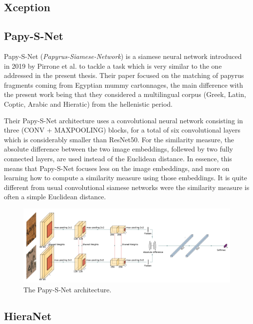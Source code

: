 \documentclass[11pt]{report}
\begin{document}
\subsection{Xception}

\subsection{Papy-S-Net}

Papy-S-Net (\emph{Papyrus-Siamese-Network}) is a siamese neural network introduced in 2019 by Pirrone et al. \cite{pir19} to tackle a task which is very similar to the one addressed in the present thesis. Their paper focused on the matching of papyrus fragments coming from Egyptian mummy cartonnages, the main difference with the present work being that they considered a multilingual corpus (Greek, Latin, Coptic, Arabic and Hieratic) from the hellenistic period.\newline

Their Papy-S-Net architecture uses a convolutional neural network consisting in three (CONV + MAXPOOLING) blocks, for a total of six convolutional layers which is considerably smaller than ResNet50. For the similarity measure, the absolute difference between the two image embeddings, follewed by two fully connected layers, are used instead of the Euclidean distance. In essence, this means that Papy-S-Net focuses less on the image embeddings, and more on learning how to compute a similarity measure using those embeddings. It is quite different from usual convolutional siamese networks were the similarity measure is often a simple Euclidean distance.

\begin{figure}[H]
\centering\includegraphics[width=15cm]{papysnet.PNG}
\caption{The Papy-S-Net architecture.}
\label{papysnet}
\end{figure}

\subsection{HieraNet}
\end{document}
